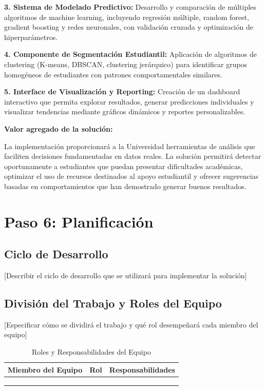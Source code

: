 \documentclass[12pt,letterpaper]{report}
\begin{document}
\textbf{3. Sistema de Modelado Predictivo:} Desarrollo y comparación de múltiples algoritmos de machine learning, incluyendo regresión múltiple, random forest, gradient boosting y redes neuronales, con validación cruzada y optimización de hiperparámetros.

\textbf{4. Componente de Segmentación Estudiantil:} Aplicación de algoritmos de clustering (K-means, DBSCAN, clustering jerárquico) para identificar grupos homogéneos de estudiantes con patrones comportamentales similares.

\textbf{5. Interface de Visualización y Reporting:} Creación de un dashboard interactivo que permita explorar resultados, generar predicciones individuales y visualizar tendencias mediante gráficos dinámicos y reportes personalizables.

\textbf{Valor agregado de la solución:}

La implementación proporcionará a la Universidad herramientas de análisis que faciliten decisiones fundamentadas en datos reales. 
La solución permitirá detectar oportunamente a estudiantes que puedan presentar dificultades académicas, optimizar el uso de recursos destinados al apoyo estudiantil y 
ofrecer sugerencias basadas en comportamientos que han demostrado generar buenos resultados.

\section{Paso 6: Planificación}

\subsection{Ciclo de Desarrollo}
[Describir el ciclo de desarrollo que se utilizará para implementar la solución]

\subsection{División del Trabajo y Roles del Equipo}
[Especificar cómo se dividirá el trabajo y qué rol desempeñará cada miembro del equipo]

\begin{table}[H]
    \centering
    \begin{tabularx}{\textwidth}{|X|X|X|}
        \hline
        \textbf{Miembro del Equipo} & \textbf{Rol} & \textbf{Responsabilidades} \\
        \hline
        & & \\
        \hline
        & & \\
        \hline
        & & \\
        \hline
    \end{tabularx}
    \caption{Roles y Responsabilidades del Equipo}
\end{table}
\end{document}
